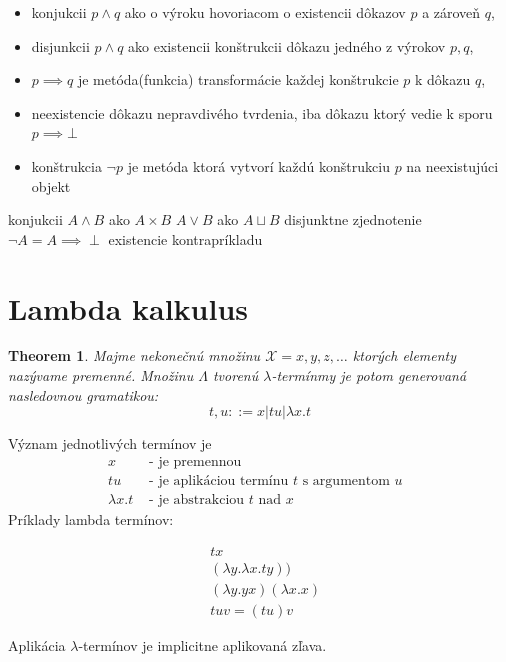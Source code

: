 \documentclass[a4paper,10pt,oneside]{report}%
\newtheorem{theorem}{Theorem}
\begin{document}
\begin{itemize}
    \item konjukcii $ p \wedge q $ ako o výroku hovoriacom o existencii dôkazov $p$ a zároveň $q$,
    \item disjunkcii $ p \wedge q $ ako existencii konštrukcii dôkazu jedného z výrokov $p, q$,
    \item $ p \implies q $ je metóda(funkcia) transformácie každej konštrukcie $p$ k dôkazu $q$,
    \item neexistencie dôkazu nepravdivého tvrdenia, iba dôkazu ktorý vedie k sporu $p \implies \bot$
    \item konštrukcia $\neg p$ je metóda ktorá vytvorí každú konštrukciu $p$ na neexistujúci objekt
\end{itemize}

konjukcii $ A \wedge B $ ako $ A \times B $
$ A \vee B $ ako $ A \sqcup B $ disjunktne zjednotenie
$ \neg A = A \implies \perp $ existencie kontrapríkladu

\section{Lambda kalkulus}

\begin{theorem}
    Majme nekonečnú množinu $ \mathcal{X}={x,y,z,\dots}$ ktorých elementy nazývame premenné.
Množinu $\Lambda$ tvorenú $\lambda$-termínmy je potom generovaná nasledovnou gramatikou:
    \begin{equation}
        t, u ::= x | t u | \lambda x.t
    \end{equation}
\end{theorem}
\noindent Význam jednotlivých termínov je
\begin{align*}
     x          & \textrm{ - je premennou }\\
     t u        & \textrm{ - je aplikáciou termínu $t$ s argumentom $u$ }\\
    \lambda x.t & \textrm{ - je abstrakciou $t$ nad $x$ }
\end{align*}
Príklady lambda termínov:

\begin{align*}
    & t x \\
    & (\lambda y . \lambda x . t y )) \\
    & (\lambda y.y x) (\lambda x . x) \\
    & t u v = ( t u ) v
\end{align*}

Aplikácia $\lambda$-termínov je implicitne aplikovaná zľava.
\end{document}
